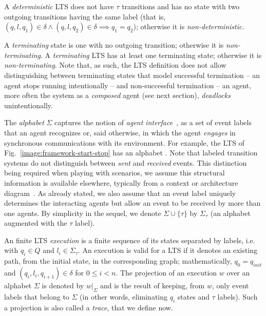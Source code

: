 A \emph{deterministic} LTS does not have $\tau$ transitions and has no state with two outgoing transitions having the same label (that is, $(q,l,q_1) \in \delta \wedge (q,l,q_2) \in \delta \implies q_1 = q_2$); otherwise it is \emph{non-deterministic}.

A \emph{terminating} state is one with no outgoing transition; otherwise it is \emph{non-terminating}. A \emph{terminating} LTS has at least one terminating state; otherwise it is \emph{non-terminating}. Note that, as such, the LTS definition does not allow distinguishing between terminating states that model successful termination -- an agent stops running intentionally -- and non-successful termination -- an agent, more often the system as a \emph{composed} agent (see next section), \emph{deadlocks} unintentionally.

The \emph{alphabet} $\Sigma$ captures the notion of \emph{agent interface}~\cite{Feather:1987}, as a set of event labels that an agent recognizes or, said otherwise, in which the agent \emph{engages} in synchronous communications with its environment. For example, the LTS of Fig.~\ref{image:framework-start-stop} has an alphabet . Note that labeled transition systems do not distinguish between \emph{sent} and \emph{received} events. This distinction being required when playing with scenarios, we assume this structural information is available elsewhere, typically from a context or architecture diagram~\cite{Ward:1985, Magee:1995}. As already stated, we also assume that an event label uniquely determines the interacting agents but allow an event to be received by more than one agents. By simplicity in the sequel, we denote $\Sigma\cup\{\tau\}$ by $\Sigma_{\tau}$ (an alphabet augmented with the $\tau$ label).

An finite LTS \emph{execution} is a finite sequence of its states separated by labels, i.e.  with $q_i \in Q$ and $l_i \in \Sigma_{\tau}$. An execution is valid for a LTS if it denotes an existing path, from the initial state, in the corresponding graph; mathematically, $q_0 = q_{init}$ and $(q_i,l_i,q_{i+1}) \in \delta$ for $0 \leq i < n$. The projection of an execution $w$ over an alphabet $\Sigma$ is denoted by $w|_{\Sigma}$ and is the result of keeping, from $w$, only event labels that belong to $\Sigma$ (in other words, eliminating $q_i$ states and $\tau$ labels). Such a projection is also called a \emph{trace}, that we define now.

